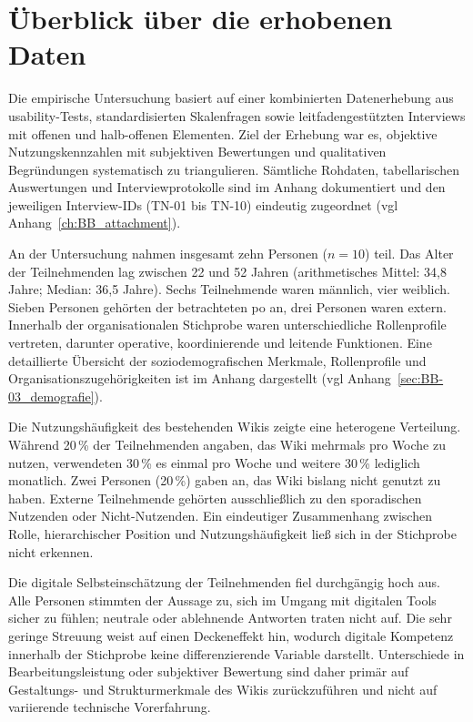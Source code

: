 \section{Überblick über die erhobenen Daten}
\label{sec:05-01_data-overview}

Die empirische Untersuchung basiert auf einer kombinierten Datenerhebung aus \Gls{usability}-Tests, standardisierten Skalenfragen sowie leitfadengestützten Interviews mit offenen und halb-offenen Elementen. Ziel der Erhebung war es, objektive Nutzungskennzahlen mit subjektiven Bewertungen und qualitativen Begründungen systematisch zu triangulieren. Sämtliche Rohdaten, tabellarischen Auswertungen und Interviewprotokolle sind im Anhang dokumentiert und den jeweiligen Interview-IDs (TN-01 bis TN-10) eindeutig zugeordnet (\acrshort{vgl} Anhang~\ref{ch:BB_attachment}).

An der Untersuchung nahmen insgesamt zehn Personen (\(n = 10\)) teil. Das Alter der Teilnehmenden lag zwischen 22 und 52 Jahren (arithmetisches Mittel: 34{,}8 Jahre; Median: 36{,}5 Jahre). Sechs Teilnehmende waren männlich, vier weiblich. Sieben Personen gehörten der betrachteten \acrlong{po} an, drei Personen waren extern. Innerhalb der organisationalen Stichprobe waren unterschiedliche Rollenprofile vertreten, darunter operative, koordinierende und leitende Funktionen. Eine detaillierte Übersicht der soziodemografischen Merkmale, Rollenprofile und Organisationszugehörigkeiten ist im Anhang dargestellt (\acrshort{vgl} Anhang~\ref{sec:BB-03_demografie}).

Die Nutzungshäufigkeit des bestehenden Wikis zeigte eine heterogene Verteilung. Während 20\,\% der Teilnehmenden angaben, das Wiki mehrmals pro Woche zu nutzen, verwendeten 30\,\% es einmal pro Woche und weitere 30\,\% lediglich monatlich. Zwei Personen (20\,\%) gaben an, das Wiki bislang nicht genutzt zu haben. Externe Teilnehmende gehörten ausschließlich zu den sporadischen Nutzenden oder Nicht-Nutzenden. Ein eindeutiger Zusammenhang zwischen Rolle, hierarchischer Position und Nutzungshäufigkeit ließ sich in der Stichprobe nicht erkennen.

Die digitale Selbsteinschätzung der Teilnehmenden fiel durchgängig hoch aus. Alle Personen stimmten der Aussage zu, sich im Umgang mit digitalen Tools sicher zu fühlen; neutrale oder ablehnende Antworten traten nicht auf. Die sehr geringe Streuung weist auf einen Deckeneffekt hin, wodurch digitale Kompetenz innerhalb der Stichprobe keine differenzierende Variable darstellt. Unterschiede in Bearbeitungsleistung oder subjektiver Bewertung sind daher primär auf Gestaltungs- und Strukturmerkmale des Wikis zurückzuführen und nicht auf variierende technische Vorerfahrung.

